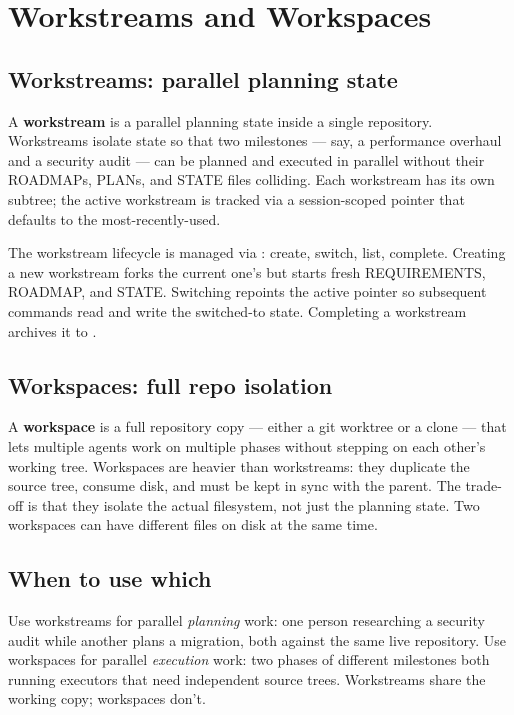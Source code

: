 \documentclass[11pt,letterpaper,openany]{book}
\begin{document}
\chapter{Workstreams and Workspaces}

\section{Workstreams: parallel planning state}

A \textbf{workstream} is a parallel planning state inside a single repository. Workstreams isolate  state so that two milestones — say, a performance overhaul and a security audit — can be planned and executed in parallel without their ROADMAPs, PLANs, and STATE files colliding. Each workstream has its own  subtree; the active workstream is tracked via a session-scoped pointer that defaults to the most-recently-used.

The workstream lifecycle is managed via : create, switch, list, complete. Creating a new workstream forks the current one's  but starts fresh REQUIREMENTS, ROADMAP, and STATE. Switching repoints the active pointer so subsequent commands read and write the switched-to state. Completing a workstream archives it to .

\section{Workspaces: full repo isolation}

A \textbf{workspace} is a full repository copy — either a git worktree or a clone — that lets multiple agents work on multiple phases without stepping on each other's working tree. Workspaces are heavier than workstreams: they duplicate the source tree, consume disk, and must be kept in sync with the parent. The trade-off is that they isolate the actual filesystem, not just the planning state. Two workspaces can have different files on disk at the same time.

\section{When to use which}

Use workstreams for parallel \emph{planning} work: one person researching a security audit while another plans a migration, both against the same live repository. Use workspaces for parallel \emph{execution} work: two phases of different milestones both running executors that need independent source trees. Workstreams share the working copy; workspaces don't.
\end{document}
